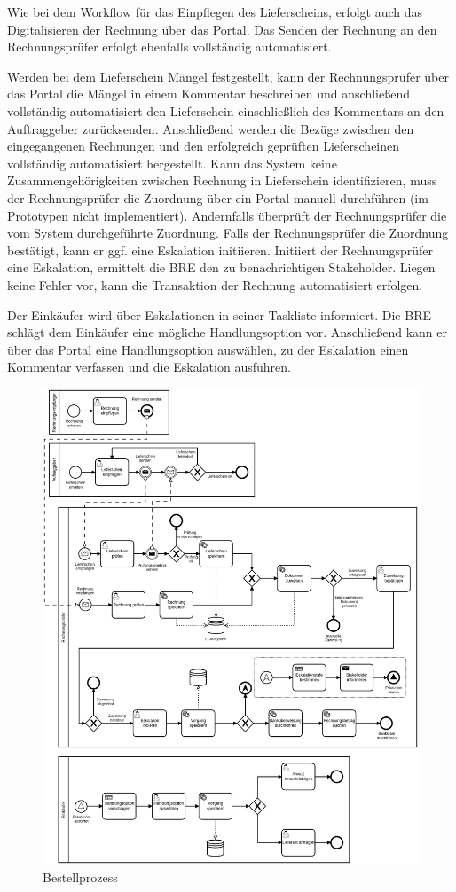 Wie bei dem Workflow für das Einpflegen des Lieferscheins, erfolgt auch das Digitalisieren der Rechnung über das Portal. Das Senden der Rechnung an den Rechnungsprüfer erfolgt ebenfalls vollständig automatisiert.

Werden bei dem Lieferschein Mängel festgestellt, kann der Rechnungsprüfer über das Portal die Mängel in einem Kommentar beschreiben und anschließend vollständig automatisiert den Lieferschein einschließlich des Kommentars an den Auftraggeber zurücksenden. Anschließend werden die Bezüge zwischen den eingegangenen Rechnungen und den erfolgreich geprüften Lieferscheinen vollständig automatisiert hergestellt. Kann das System keine Zusammengehörigkeiten zwischen Rechnung in Lieferschein identifizieren, muss der Rechnungsprüfer die Zuordnung über ein Portal manuell durchführen (im Prototypen nicht implementiert). Andernfalls überprüft der Rechnungsprüfer die vom System durchgeführte Zuordnung. Falls der Rechnungsprüfer die Zuordnung bestätigt, kann er ggf. eine Eskalation initiieren. Initiiert der Rechnungsprüfer eine Eskalation, ermittelt die BRE den zu benachrichtigen Stakeholder. Liegen keine Fehler vor, kann die Transaktion der Rechnung automatisiert erfolgen.

Der Einkäufer wird über Eskalationen in seiner Taskliste informiert. Die BRE schlägt dem Einkäufer eine mögliche Handlungsoption vor. Anschließend kann er über das Portal eine Handlungsoption auswählen, zu der Eskalation einen Kommentar verfassen und die Eskalation ausführen.

\begin{figure}
  \centering
  \includegraphics{images/rechnung.png}
  \caption{Bestellprozess}
  \label{fig:WF-Bestellprozess}
\end{figure}

